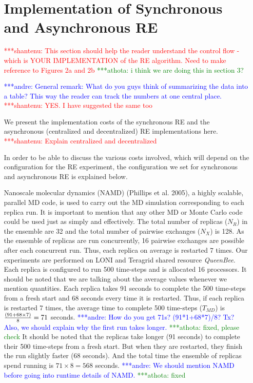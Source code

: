 \documentclass{rspublic}
\newcommand{\jhanote}[1]{ {\textcolor{red} { ***shantenu: #1 }}}
\newcommand{\alnote}[1]{ {\textcolor{blue} { ***andre: #1 }}}
\newcommand{\athotanote}[1]{ {\textcolor{green} { ***athota: #1 }}}
\newcommand{\alnote}[1]{}
\newcommand{\athotanote}[1]{}
\newcommand{\jhanote}[1]{}
\begin{document}
\section{Implementation of Synchronous and Asynchronous RE}

\jhanote{This section should help the reader understand the control
  flow - which is YOUR IMPLEMENTATION of the RE algorithm. Need to
  make reference to Figures 2a and 2b} \athotanote{i think we are doing this in section 3?}

\alnote{General remark: What do you guys think of summarizing the data into 
a table? This way the reader can track the numbers at one central place.}
\jhanote{YES. I have suggested the same too}

We present the implementation costs of the synchronous RE and the
asynchronous (centralized and decentralized) RE implementations here.
\jhanote{Explain centralized and decentralized} 

In order to be able to discuss the various costs involved, which will depend on the configuration for the RE experiment, the configuration we set for synchronous and asynchronous RE is explained below.

Nanoscale molecular dynamics (NAMD)
(Phillips et al.  2005), a highly scalable, parallel MD code, is used
to carry out the MD simulation corresponding to each replica run. It
is important to mention that any other MD or Monte Carlo code could be
used just as simply and effectively. The total number of
replicas ($N_R$) in the ensemble are 32 and the total number of
pairwise exchanges ($N_X$) is 128. As the ensemble of replicas are run concurrently, 16 pairwise exchanges are possible after each concurrent run. Thus, each replica on average is restarted 7 times.
Our experiments are performed on
LONI and Teragrid shared resource \emph{QueenBee}. Each replica is
configured to run 500 time-steps and is allocated 16 processors. It
should be noted that we are talking about the average values whenever
we mention quantities. Each replica takes 91 seconds to complete the
500 time-steps from a fresh start and 68 seconds every time it is
restarted. Thus, if each replica is restarted 7 times, the average
time to complete 500 time-steps ($T_{MD}$) is ${(91+68\times 7) \over8} = 71$ seconds. 
\alnote{How do you get 71s?
  (91*1+68*7)/8? Tx?  Also, we should explain why the first run takes
  longer.} \athotanote{fixed, please check}  It should be noted that the replicas take longer (91 seconds) to complete their 500 time-steps from a fresh start. But when they are restarted, they finish the run slightly faster (68 seconds).   And the total time the ensemble of replicas spend running is $71 \times 8 = 568$ seconds. \alnote{We should mention NAMD before going
  into runtime details of NAMD.} \athotanote{fixed} 
  
\end{document}
